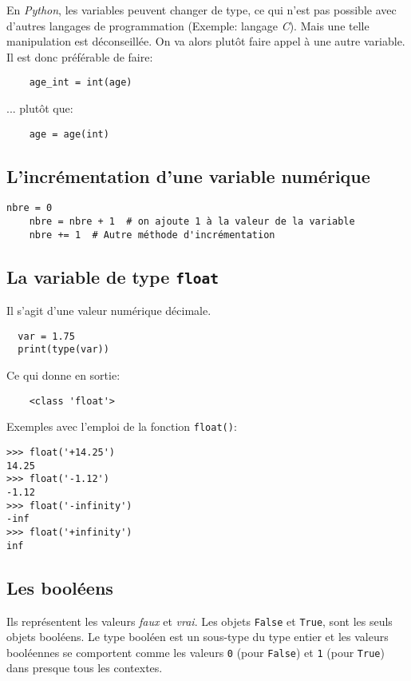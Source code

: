En \textit{Python}, les variables peuvent changer de type, ce qui n'est pas possible avec d'autres langages de programmation (Exemple: langage \textit{C}). Mais une telle manipulation est déconseillée. On va alors plutôt faire appel à une autre variable. Il est donc préférable de faire:
\begin{verbatim}
    age_int = int(age)
\end{verbatim}
\medskip

... plutôt que:
\begin{verbatim}
    age = age(int)
\end{verbatim}
\medskip

\subsection*{L'incrémentation d'une variable numérique}
\begin{lstlisting}[caption=Principe de l'incrémentation]
    nbre = 0
    nbre = nbre + 1  # on ajoute 1 à la valeur de la variable
    nbre += 1  # Autre méthode d'incrémentation
\end{lstlisting}
\medskip

\subsection*{La variable de type \texttt{float}}
Il s'agit d'une valeur numérique décimale.
\begin{lstlisting}
  var = 1.75
  print(type(var))
\end{lstlisting}
\medskip

Ce qui donne en sortie:
\begin{verbatim}
    <class 'float'>
\end{verbatim}
\medskip

Exemples avec l'emploi de la fonction \texttt{float()}:
\begin{verbatim}
>>> float('+14.25')
14.25
>>> float('-1.12')
-1.12
>>> float('-infinity')
-inf
>>> float('+infinity')
inf
\end{verbatim}
\medskip

\subsection*{Les booléens}
Ils représentent les valeurs \textit{faux} et \textit{vrai}. Les objets \texttt{False} et \texttt{True}, sont les seuls objets booléens. Le type booléen est un sous-type du type entier et les valeurs booléennes se comportent comme les valeurs \texttt{0} (pour \texttt{False}) et \texttt{1} (pour \texttt{True}) dans presque tous les contextes.
\medskip

